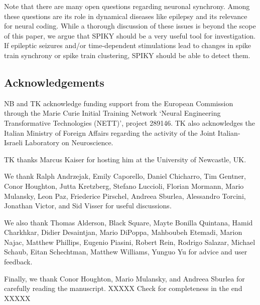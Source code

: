 \documentclass[10pt,twocolumn]{elsart5p}
\begin{document}
Note that there are many open questions regarding neuronal synchrony. Among these questions are its role in dynamical diseases like epilepsy and its relevance for neural coding. While a thorough discussion of these issues is beyond the scope of this paper, we argue that SPIKY should be a very useful tool for investigation. If epileptic seizures and/or time-dependent stimulations lead to changes in spike train synchrony or spike train clustering, SPIKY should be able to detect them.




\vspace{1cm}

\begin{thanks}
\section{\label{s:Acknowledgement} \textbf{Acknowledgements}}

NB and TK acknowledge funding support from the European Commission through the Marie Curie Initial Training 	Network `Neural Engineering Transformative Technologies (NETT)', project 289146. TK also acknowledges the Italian Ministry of Foreign Affairs regarding the activity of the Joint Italian-Israeli Laboratory on Neuroscience.

TK thanks Marcus Kaiser for hosting him at the University of Newcastle, UK.
     
We thank Ralph Andrzejak, Emily Caporello, Daniel Chicharro, Tim Gentner, Conor Houghton, Jutta Kretzberg, Stefano Luccioli, Florian Mormann, Mario Mulansky, Leon Paz, Friederice Pirschel, Andreea Sburlea, Alessandro Torcini, Jonathan Victor, and Sid Visser for useful discussions.

We also thank Thomas Alderson, Black Square, Mayte Bonilla Quintana, Hamid Charkhkar, Didier Desaintjan, Mario DiPoppa, Mahboubeh Etemadi, Marion Najac, Matthew Phillips, Eugenio Piasini, Robert Rein, Rodrigo Salazar, Michael Schaub, Eitan Schechtman, Matthew Williams, Yunguo Yu for advice and user feedback.

Finally, we thank Conor Houghton, Mario Mulansky, and Andreea Sburlea for carefully reading the manuscript. XXXXX Check for completeness in the end XXXXX
\end{thanks}
\end{document}
